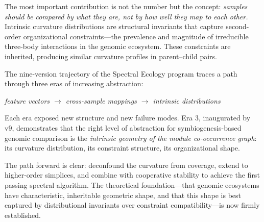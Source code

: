 \documentclass{../yalumba}
\begin{document}

The most important contribution is not the number but the concept:
\emph{samples should be compared by what they are, not by how well they map
to each other.}  Intrinsic curvature distributions are structural
invariants that capture second-order organizational constraints---the
prevalence and magnitude of irreducible three-body interactions in the
genomic ecosystem.  These constraints are inherited, producing similar
curvature profiles in parent--child pairs.

The nine-version trajectory of the Spectral Ecology program traces a path
through three eras of increasing abstraction:

\begin{center}
\emph{feature vectors $\to$ cross-sample mappings $\to$ intrinsic
distributions}
\end{center}

Each era exposed new structure and new failure modes.  Era 3, inaugurated by
v9, demonstrates that the right level of abstraction for symbiogenesis-based
genomic comparison is the \emph{intrinsic geometry of the module co-occurrence
graph}: its curvature distribution, its constraint structure, its
organizational shape.

The path forward is clear: deconfound the curvature from coverage, extend
to higher-order simplices, and combine with cooperative stability to achieve
the first passing spectral algorithm.  The theoretical foundation---that
genomic ecosystems have characteristic, inheritable geometric shape, and
that this shape is best captured by distributional invariants over constraint
compatibility---is now firmly established.




\end{document}
